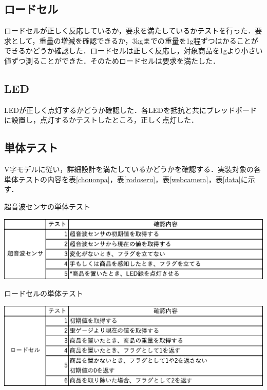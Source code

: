 \subsection*{ロードセル}

ロードセルが正しく反応しているか，要求を満たしているかテストを行った．要求として，重量の増減を確認できるか，3kgまでの重量を1g程ずつはかることができるかどうか確認した．ロードセルは正しく反応し，対象商品を1gより小さい値ずつ測ることができた．そのためロードセルは要求を満たした．

\subsection*{LED}

LEDが正しく点灯するかどうか確認した．各LEDを抵抗と共にブレッドボードに設置し，点灯するかテストしたところ，正しく点灯した．


\subsection{単体テスト}

V字モデルに従い，詳細設計を満たしているかどうかを確認する．実装対象の各単体テストの内容を表\ref{chouonpa}，表\ref{rodoseru}，表\ref{webcamera}，表\ref{data}に示す．


\begin{table}[htbp]
\centering
\caption{超音波センサの単体テスト}
\includegraphics[width = 15cm]{./picture/chouonpa.eps}
\label{chouonpa}
\end{table}

\begin{table}[htbp]
\centering
\caption{ロードセルの単体テスト}
\includegraphics[width = 15cm]{./picture/rodoseru.eps}
\label{rodoseru}
\end{table}

